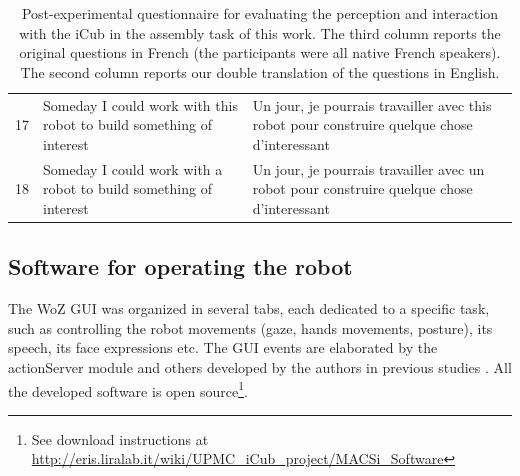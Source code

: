 \begin{table}
{\begin{tabular}{|c|p{7.5cm}|p{7.5cm}|}
17 & Someday I could work with this robot to build something of interest& Un jour, je pourrais travailler avec this robot pour construire quelque chose d'interessant\\
18&  Someday I could work with a robot to build something of interest& Un jour, je pourrais travailler avec un robot pour construire quelque chose d'interessant\\
\hline
\end{tabular}}
\caption{Post-experimental questionnaire for evaluating the perception and interaction with the iCub in the assembly task of this work. The third column reports the original questions in French (the participants were all native French speakers). The second column reports our double translation of the questions in English.}
\label{table:postexperimentquestionnaire}
\end{table}


\subsection{Software for operating the robot}\label{appendix:GUI}

The WoZ GUI was organized in several tabs, each dedicated to a specific task, such as controlling the robot movements (gaze, hands movements, posture), its speech, its face expressions etc.
The GUI events are elaborated by the actionServer module and others developed by the authors in previous studies \cite{ivaldi2014frontiers,Ivaldi2014tamd}. All the developed software is open source\footnote{See download instructions at \url{http://eris.liralab.it/wiki/UPMC_iCub_project/MACSi_Software}}.

